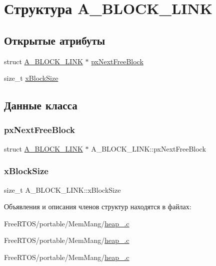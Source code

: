 \hypertarget{struct_a___b_l_o_c_k___l_i_n_k}{}\section{Структура A\+\_\+\+B\+L\+O\+C\+K\+\_\+\+L\+I\+NK}
\label{struct_a___b_l_o_c_k___l_i_n_k}
\subsection*{Открытые атрибуты}
\begin{DoxyCompactItemize}
\item 
struct \mbox{\hyperlink{struct_a___b_l_o_c_k___l_i_n_k}{A\+\_\+\+B\+L\+O\+C\+K\+\_\+\+L\+I\+NK}} $\ast$ \mbox{\hyperlink{struct_a___b_l_o_c_k___l_i_n_k_aaef1b26e95b0b7b7ebffc91fa6ce874f}{px\+Next\+Free\+Block}}
\item 
size\+\_\+t \mbox{\hyperlink{struct_a___b_l_o_c_k___l_i_n_k_ad5dcf5df03d8be6186c567be9e2c657b}{x\+Block\+Size}}
\end{DoxyCompactItemize}


\subsection{Данные класса}
\mbox{\label{struct_a___b_l_o_c_k___l_i_n_k_aaef1b26e95b0b7b7ebffc91fa6ce874f}} 
\subsubsection{\texorpdfstring{pxNextFreeBlock}{pxNextFreeBlock}}
{\footnotesize\ttfamily struct \mbox{\hyperlink{struct_a___b_l_o_c_k___l_i_n_k}{A\+\_\+\+B\+L\+O\+C\+K\+\_\+\+L\+I\+NK}} $\ast$ A\+\_\+\+B\+L\+O\+C\+K\+\_\+\+L\+I\+N\+K\+::px\+Next\+Free\+Block}

\mbox{\label{struct_a___b_l_o_c_k___l_i_n_k_ad5dcf5df03d8be6186c567be9e2c657b}} 
\subsubsection{\texorpdfstring{xBlockSize}{xBlockSize}}
{\footnotesize\ttfamily size\+\_\+t A\+\_\+\+B\+L\+O\+C\+K\+\_\+\+L\+I\+N\+K\+::x\+Block\+Size}



Объявления и описания членов структур находятся в файлах\+:\begin{DoxyCompactItemize}
\item 
Free\+R\+T\+O\+S/portable/\+Mem\+Mang/\mbox{\hyperlink{heap__2_8c}{heap\+\_.\+c}}\item 
Free\+R\+T\+O\+S/portable/\+Mem\+Mang/\mbox{\hyperlink{heap__4_8c}{heap\+\_.\+c}}\item 
Free\+R\+T\+O\+S/portable/\+Mem\+Mang/\mbox{\hyperlink{heap__5_8c}{heap\+\_.\+c}}\end{DoxyCompactItemize}
